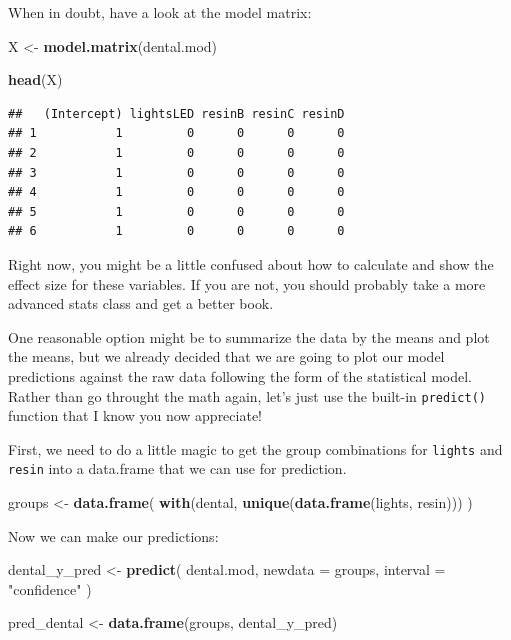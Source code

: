 \documentclass[
]{book}
\newenvironment{Shaded}{\begin{snugshade}}{\end{snugshade}}
\newcommand{\DataTypeTok}[1]{\textcolor[rgb]{0.13,0.29,0.53}{#1}}
\newcommand{\KeywordTok}[1]{\textcolor[rgb]{0.13,0.29,0.53}{\textbf{#1}}}
\newcommand{\NormalTok}[1]{#1}
\newcommand{\StringTok}[1]{\textcolor[rgb]{0.31,0.60,0.02}{#1}}
\begin{document}
When in doubt, have a look at the model matrix:

\begin{Shaded}
\begin{Highlighting}[]
\NormalTok{X <-}\StringTok{ }\KeywordTok{model.matrix}\NormalTok{(dental.mod)}

\KeywordTok{head}\NormalTok{(X)}
\end{Highlighting}
\end{Shaded}

\begin{verbatim}
##   (Intercept) lightsLED resinB resinC resinD
## 1           1         0      0      0      0
## 2           1         0      0      0      0
## 3           1         0      0      0      0
## 4           1         0      0      0      0
## 5           1         0      0      0      0
## 6           1         0      0      0      0
\end{verbatim}

Right now, you might be a little confused about how to calculate and show the effect size for these variables. If you are not, you should probably take a more advanced stats class and get a better book.

One reasonable option might be to summarize the data by the means and plot the means, but we already decided that we are going to plot our model predictions against the raw data following the form of the statistical model. Rather than go throught the math again, let's just use the built-in \texttt{predict()} function that I know you now appreciate!

First, we need to do a little magic to get the group combinations for \texttt{lights} and \texttt{resin} into a data.frame that we can use for prediction.

\begin{Shaded}
\begin{Highlighting}[]
\NormalTok{groups <-}\StringTok{ }\KeywordTok{data.frame}\NormalTok{(}
  \KeywordTok{with}\NormalTok{(dental, }\KeywordTok{unique}\NormalTok{(}\KeywordTok{data.frame}\NormalTok{(lights, resin)))}
\NormalTok{)}
\end{Highlighting}
\end{Shaded}

Now we can make our predictions:

\begin{Shaded}
\begin{Highlighting}[]
\NormalTok{dental_y_pred <-}\StringTok{ }\KeywordTok{predict}\NormalTok{(}
\NormalTok{  dental.mod, }\DataTypeTok{newdata =}\NormalTok{ groups, }\DataTypeTok{interval =} \StringTok{"confidence"}
\NormalTok{  )}

\NormalTok{pred_dental <-}\StringTok{ }\KeywordTok{data.frame}\NormalTok{(groups, dental_y_pred)}
\end{Highlighting}
\end{Shaded}
\end{document}
